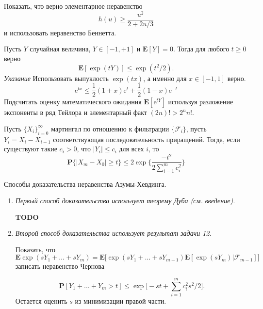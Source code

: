 \begin{remark} 
Показать, что верно элементарное неравенство 
\begin{equation*}
h(u)\geq \frac{u^2}{2+2u/3}
\end{equation*}
и использовать неравенство Беннетта.
\end{remark}

\begin{problem} Пусть $Y$ случайная величина,  $Y\in [-1,+1]$ и $\mathbf{E}[Y]=0$. Тогда для любого $t\geq 0$ верно 
\begin{equation*}
\mathbf{E}[\exp(tY)]\leq \exp(t^2/2).
\end{equation*}
\textit{Указание}
Использовать выпуклость $\exp(tx)$, а именно для $x\in[-1,1]$ верно.
\begin{equation*}
\text{e}^{tx}\leq \frac{1}{2}(1+x)\text{e}^{t} +\frac{1}{2}(1-x)\text{e}^{-t}
\end{equation*}
Подсчитать оценку математического ожидания $\mathbf{E}[\text{e}^{tY}]$ используя разложение экспоненты в ряд Тейлора и элементарный факт $(2n)!>2^nn!$.  
\end{problem}

\begin{problem}

Пусть $\{X_i\}_{i=0}^{\infty}$ мартингал по отношению к фильтрации $\{\mathcal{F}_i\}$, пусть $Y_i = X_i-X_{i-1}$ соответствующая последовательность приращений. Тогда, если существуют такие $c_i>0$, что $|Y_i|\leq c_i$ для всех $i$, то 
\begin{equation*}
\mathbf{P}\{|X_m-X_0|\geq t\}\leq 2\exp\bigg\{\frac{-t^2}{2\sum_{i=1}^{m}c^2_i}\biggl\}
\end{equation*}
\end{problem}

\begin{remark} Способы доказательства неравенства Азумы-Хевдинга. 
\medskip
\begin{enumerate}

\item \textit{Первый способ доказательства использует теорему Дуба (см. введение).} 

\textbf{TODO}


\item \textit{Второй способ доказательства использует результат задачи 12.}

Показать, что 
\begin{equation*}
\mathbf{E}\exp(sY_1+\dots+ sY_m) = \mathbf{E}\big[\exp(sY_1+\dots+sY_{m-1})\mathbf{E}[\exp(sY_m)|\mathcal{F}_{m-1}]\bigl] 
\end{equation*}
записать неравенство Чернова

\begin{equation*}
\mathbf{P}[Y_1+\dots+Y_m>t]\leq \exp\big[-st+\sum_{i=1}^mc^2_i s^2/2\bigr].
\end{equation*}
Остается оценить $s$ из минимизации правой части.
\end{enumerate}

\end{remark}

